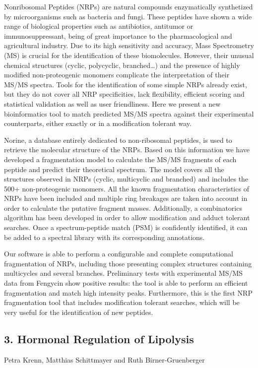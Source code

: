 Nonribosomal Peptides (NRPs) are natural compounds enzymatically synthetized by microorganisms such as bacteria and fungi. These peptides have shown a wide range of biological properties such as antibiotics, antitumor or immunosuppressant, being of great importance to the pharmacological and agricultural industry. Due to its high sensitivity and accuracy, Mass Spectrometry (MS) is crucial for the identification of these biomolecules. However, their unusual chemical structures (cyclic, polycyclic, branched…) and the presence of highly modified non-proteogenic monomers complicate the interpretation of their MS/MS spectra. Tools for the identification of some simple NRPs already exist, but they do not cover all NRP specificities, lack flexibility, efficient scoring and statistical validation as well as user friendliness. Here we present a new bioinformatics tool to match predicted MS/MS spectra against their experimental counterparts, either exactly or in a modification tolerant way.

Norine, a database entirely dedicated to non-ribosomal peptides, is used to retrieve the molecular structure of the NRPs. Based on this information we have developed a fragmentation model to calculate the MS/MS fragments of each peptide and predict their theoretical spectrum. The model covers all the structures observed in NRPs (cyclic, multicyclic and branched) and includes the 500+ non-proteogenic monomers. All the known fragmentation characteristics of NRPs have been included and multiple ring breakages are taken into account in order to calculate the putative fragment masses. Additionally, a combinatorics algorithm has been developed in order to allow modification and adduct tolerant searches. Once a spectrum-peptide match (PSM) is confidently identified, it can be added to a spectral library with its corresponding annotations.

Our software is able to perform a configurable and complete computational fragmentation of NRPs, including those presenting complex structures containing multicycles and several branches. Preliminary tests with experimental MS/MS data from Fengycin show positive results: the tool is able to perform an efficient fragmentation and match high intensity peaks. Furthermore, this is the first NRP fragmentation tool that includes modification tolerant searches, which will be very useful for the identification of new peptides.

\subsection*{\color{eubicRed} 3. Hormonal Regulation of Lipolysis}
{\color{eubicGray}Petra Krenn, Matthias Schittmayer and Ruth Birner-Gruenberger}


